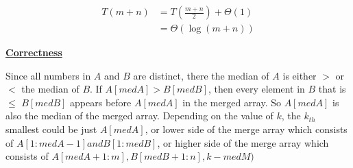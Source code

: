 \documentclass[11pt]{article}
\begin{document}
\begin{enumerate}
  \begin{equation}
    \begin{split}
      T(m+n) &= T(\frac{m+n}{2}) + \Theta(1)\\
      &= \Theta(\log {(m+n)})
    \end{split}
  \end{equation}

  \underline{\textbf{Correctness}}

  Since all numbers in $A$ and $B$ are distinct, there the median of
  $A$ is either $>$ or $<$ the median of $B$.
  If $A[medA] > B[medB]$, then every element in $B$ that is $\leq$
  $B[medB]$ appears before $A[medA]$ in the merged array. So $A[medA]$
  is also the median of the merged array. Depending on the value of
  $k$, the $k_{th}$ smallest could be just $A[medA]$, or lower side of
  the merge array which consists of $A[1:medA-1] and B[1:medB]$, or
  higher side of the merge array which consists of $A[medA+1:m],
  B[medB+1:n], k-medM)$ 

\end{enumerate}
\end{document}
